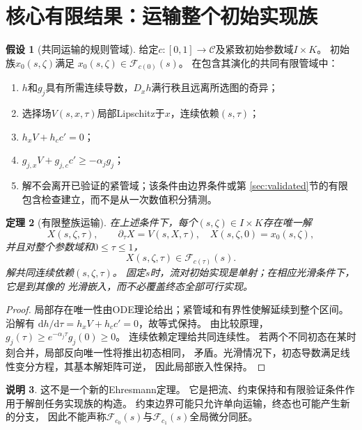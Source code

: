 \documentclass[UTF8,11pt,a4paper,fontset=fandol]{ctexart}
\numberwithin{equation}{section}
\newtheorem{theorem}{定理}[section]
\theoremstyle{definition}
\newtheorem{assumption}[theorem]{假设}
\newtheorem{remark}[theorem]{说明}
\newcommand{\dd}{\mathrm d}
\begin{document}
\section{核心有限结果：运输整个初始实现族}

\begin{assumption}[共同运输的规则管域]
给定$c:[0,1]\to\mathcal C$及紧致初始参数域$I\times K$。
初始族$x_0(s,\zeta)$满足
$x_0(s,\zeta)\in\mathcal F_{c(0)}(s)$。
在包含其演化的共同有限管域中：
\begin{enumerate}
\item $h$和$g_j$具有所需连续导数，$D_xh$满行秩且远离所选图的奇异；
\item 选择场$V(s,x,\tau)$局部Lipschitz于$x$，连续依赖$(s,\tau)$；
\item $h_xV+h_c c'=0$；
\item $g_{j,x}V+g_{j,c}c'\geq-\alpha_jg_j$；
\item 解不会离开已验证的紧管域；该条件由边界条件或第
\ref{sec:validated}节的有限包含检查建立，而不是从一次数值积分猜测。
\end{enumerate}
\end{assumption}

\begin{theorem}[有限整族运输]
在上述条件下，每个$(s,\zeta)\in I\times K$存在唯一解
\begin{equation}
 X(s,\zeta,\tau),\qquad
 \partial_\tau X=V(s,X,\tau),\quad
 X(s,\zeta,0)=x_0(s,\zeta),
\end{equation}
并且对整个参数域和$0\leq\tau\leq1$，
\begin{equation}
 \boxed{
 X(s,\zeta,\tau)\in\mathcal F_{c(\tau)}(s).
 }
 \label{eq:familytheorem}
\end{equation}
解共同连续依赖$(s,\zeta,\tau)$。
固定$s$时，流对初始实现是单射；在相应光滑条件下，它是到其像的
光滑嵌入，而不必覆盖终态全部可行实现。
\end{theorem}

\begin{proof}
局部存在唯一性由ODE理论给出；紧管域和有界性使解延续到整个区间。
沿解有
$\dd h/\dd\tau=h_xV+h_cc'=0$，故等式保持。
由比较原理，
$g_j(\tau)\geq e^{-\alpha_j\tau}g_j(0)\geq0$。
连续依赖定理给共同连续性。
若两个不同初态在某时刻合并，局部反向唯一性将推出初态相同，
矛盾。光滑情况下，初态导数满足线性变分方程，其基本解矩阵可逆，
因此局部嵌入性保持。
\end{proof}

\begin{remark}
这不是一个新的Ehresmann定理。
它是把流、约束保持和有限验证条件作用于解剖任务实现族的构造。
约束边界可能只允许单向运输，终态也可能产生新的分支，
因此不能声称$\mathcal F_{c_0}(s)$与$\mathcal F_{c_1}(s)$全局微分同胚。
\end{remark}
\end{document}
